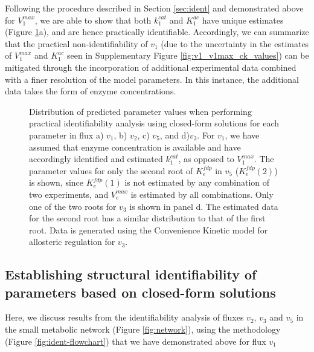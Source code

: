 \documentclass[10pt]{article}
\begin{document}
	Following the procedure described in Section \ref{sec:ident} and demonstrated above for $V_1^{max}$, we are able to show that both $k_1^{cat}$ and $K_1^{ac}$ have unique estimates (Figure \ref{fig:ident_values}a), and are hence practically identifiable. Accordingly, we can summarize that the practical non-identifiability of $v_1$ (due to the uncertainty in the estimates of $V_1^{max}$ and $K_1^{ac}$ seen in Supplementary Figure \ref{fig:v1_v1max_ck_values}) can be mitigated through the incorporation of additional experimental data combined with a finer resolution of the model parameters. In this instance, the additional data takes the form of enzyme concentrations. 
	
	\begin{figure}[!tbhp]
		\caption{Distribution of predicted parameter values when performing practical identifiability analysis using closed-form solutions for each parameter in flux a) $v_1$, b) $v_2$, c) $v_5$, and d)$v_3$. For $v_1$, we have assumed that enzyme concentration is available and have accordingly identified and estimated $k_1^{cat}$, as opposed to $V_1^{max}$. The parameter values for only the second root of $K_e^{fdp}$ in $v_5$ ($K_e^{fdp}(2)$) is shown, since $K_e^{fdp}(1)$ is not estimated by any combination of two experiments, and $V_e^{max}$ is estimated by all combinations. Only one of the two roots for $v_3$ is shown in panel d. The estimated data for the second root has a similar distribution to that of the first root. Data is generated using the Convenience Kinetic model for allosteric regulation for  $v_3$.}\label{fig:ident_values}
	\end{figure}
	
	\subsection{Establishing structural identifiability of parameters based on closed-form solutions}\label{sec:proof}
	Here, we discuss results from the identifiability analysis of fluxes $v_2$, $v_3$ and $v_5$ in the small metabolic network (Figure \ref{fig:network}), using the methodology (Figure \ref{fig:ident-flowchart}) that we have demonstrated above for flux $v_1$
	
\end{document}
